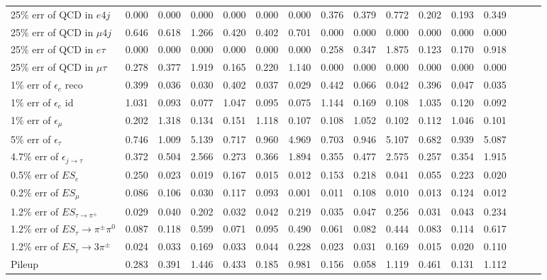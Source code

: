 \begin{sidewaystable}[p]
\begin{tabular}{|l|ccc|ccc|ccc|ccc|ccc|}
  25$\%$ err of QCD in $e 4j$                & 0.000 & 0.000 & 0.000 & 0.000 & 0.000 & 0.000 & 0.376 & 0.379 & 0.772 & 0.202 & 0.193 & 0.349 \\ 
  25$\%$ err of QCD in $\mu 4j$              & 0.646 & 0.618 & 1.266 & 0.420 & 0.402 & 0.701 & 0.000 & 0.000 & 0.000 & 0.000 & 0.000 & 0.000 \\ 
  25$\%$ err of QCD in $e\tau$               & 0.000 & 0.000 & 0.000 & 0.000 & 0.000 & 0.000 & 0.258 & 0.347 & 1.875 & 0.123 & 0.170 & 0.918 \\ 
  25$\%$ err of QCD in $\mu\tau$             & 0.278 & 0.377 & 1.919 & 0.165 & 0.220 & 1.140 & 0.000 & 0.000 & 0.000 & 0.000 & 0.000 & 0.000 \\ 
  1$\%$ err of $\epsilon_e$ reco             & 0.399 & 0.036 & 0.030 & 0.402 & 0.037 & 0.029 & 0.442 & 0.066 & 0.042 & 0.396 & 0.047 & 0.035 \\ 
  1$\%$ err of $\epsilon_e$ id               & 1.031 & 0.093 & 0.077 & 1.047 & 0.095 & 0.075 & 1.144 & 0.169 & 0.108 & 1.035 & 0.120 & 0.092 \\ 
  1$\%$ err of $\epsilon_\mu$                & 0.202 & 1.318 & 0.134 & 0.151 & 1.118 & 0.107 & 0.108 & 1.052 & 0.102 & 0.112 & 1.046 & 0.101 \\ 
  5$\%$ err of $\epsilon_\tau$               & 0.746 & 1.009 & 5.139 & 0.717 & 0.960 & 4.969 & 0.703 & 0.946 & 5.107 & 0.682 & 0.939 & 5.087 \\ 
  4.7$\%$ err of $\epsilon_{j\to\tau}$       & 0.372 & 0.504 & 2.566 & 0.273 & 0.366 & 1.894 & 0.355 & 0.477 & 2.575 & 0.257 & 0.354 & 1.915 \\ 
  0.5$\%$ err of $ES_{e}$                    & 0.250 & 0.023 & 0.019 & 0.167 & 0.015 & 0.012 & 0.153 & 0.218 & 0.041 & 0.055 & 0.223 & 0.020 \\ 
  0.2$\%$ err of $ES_{\mu}$                  & 0.086 & 0.106 & 0.030 & 0.117 & 0.093 & 0.001 & 0.011 & 0.108 & 0.010 & 0.013 & 0.124 & 0.012 \\ 
  1.2$\%$ err of $ES_{\tau\to\pi^\pm}$       & 0.029 & 0.040 & 0.202 & 0.032 & 0.042 & 0.219 & 0.035 & 0.047 & 0.256 & 0.031 & 0.043 & 0.234 \\ 
  1.2$\%$ err of $ES_{\tau}\to\pi^\pm\pi^0$  & 0.087 & 0.118 & 0.599 & 0.071 & 0.095 & 0.490 & 0.061 & 0.082 & 0.444 & 0.083 & 0.114 & 0.617 \\ 
  1.2$\%$ err of $ES_{\tau}\to3\pi^\pm$      & 0.024 & 0.033 & 0.169 & 0.033 & 0.044 & 0.228 & 0.023 & 0.031 & 0.169 & 0.015 & 0.020 & 0.110 \\ 
  Pileup                                     & 0.283 & 0.391 & 1.446 & 0.433 & 0.185 & 0.981 & 0.156 & 0.058 & 1.119 & 0.461 & 0.131 & 1.112 \\ 

\end{tabular}
\end{sidewaystable}
